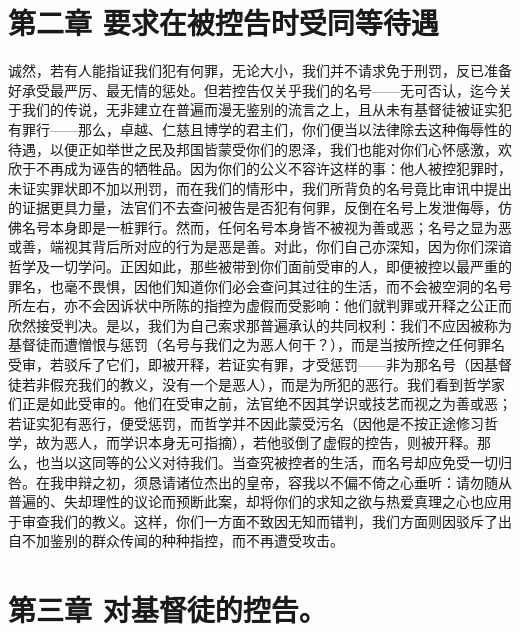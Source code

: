 
\section{第二章 要求在被控告时受同等待遇}

诚然，若有人能指证我们犯有何罪，无论大小，我们并不请求免于刑罚，反已准备好承受最严厉、最无情的惩处。但若控告仅关乎我们的名号——无可否认，迄今关于我们的传说，无非建立在普遍而漫无鉴别的流言之上，且从未有基督徒被证实犯有罪行——那么，卓越、仁慈且博学的君主们，你们便当以法律除去这种侮辱性的待遇，以便正如举世之民及邦国皆蒙受你们的恩泽，我们也能对你们心怀感激，欢欣于不再成为诬告的牺牲品。因为你们的公义不容许这样的事：他人被控犯罪时，未证实罪状即不加以刑罚，而在我们的情形中，我们所背负的名号竟比审讯中提出的证据更具力量，法官们不去查问被告是否犯有何罪，反倒在名号上发泄侮辱，仿佛名号本身即是一桩罪行。然而，任何名号本身皆不被视为善或恶；名号之显为恶或善，端视其背后所对应的行为是恶是善。对此，你们自己亦深知，因为你们深谙哲学及一切学问。正因如此，那些被带到你们面前受审的人，即便被控以最严重的罪名，也毫不畏惧，因他们知道你们必会查问其过往的生活，而不会被空洞的名号所左右，亦不会因诉状中所陈的指控为虚假而受影响：他们就判罪或开释之公正而欣然接受判决。是以，我们为自己索求那普遍承认的共同权利：我们不应因被称为基督徒而遭憎恨与惩罚（名号与我们之为恶人何干？），而是当按所控之任何罪名受审，若驳斥了它们，即被开释，若证实有罪，才受惩罚——非为那名号（因基督徒若非假充我们的教义，没有一个是恶人），而是为所犯的恶行。我们看到哲学家们正是如此受审的。他们在受审之前，法官绝不因其学识或技艺而视之为善或恶；若证实犯有恶行，便受惩罚，而哲学并不因此蒙受污名（因他是不按正途修习哲学，故为恶人，而学识本身无可指摘），若他驳倒了虚假的控告，则被开释。那么，也当以这同等的公义对待我们。当查究被控者的生活，而名号却应免受一切归咎。在我申辩之初，须恳请诸位杰出的皇帝，容我以不偏不倚之心垂听：请勿随从普遍的、失却理性的议论而预断此案，却将你们的求知之欲与热爱真理之心也应用于审查我们的教义。这样，你们一方面不致因无知而错判，我们方面则因驳斥了出自不加鉴别的群众传闻的种种指控，而不再遭受攻击。\par


\section{第三章 对基督徒的控告。}

